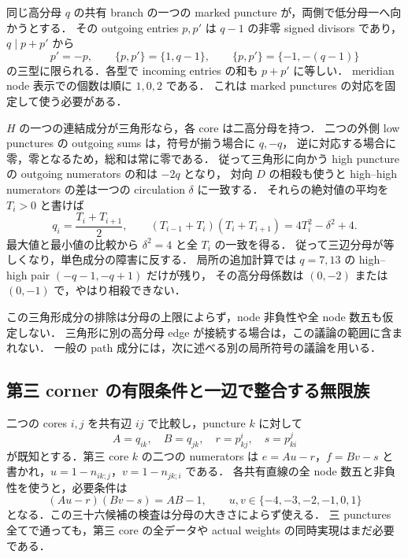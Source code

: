 同じ高分母 $q$ の共有 branch の一つの marked puncture が，両側で低分母一へ向かうとする．
その outgoing entries $p,p'$ は $q-1$ の非零 signed divisors であり，
$q\mid p+p'$ から
\[
 p'=-p,\qquad\{p,p'\}=\{1,q-1\},\qquad
 \{p,p'\}=\{-1,-(q-1)\}
\]
の三型に限られる．各型で incoming entries の和も $p+p'$ に等しい．
meridian node 表示での個数は順に $1,0,2$ である．
これは marked punctures の対応を固定して使う必要がある．

$H$ の一つの連結成分が三角形なら，各 core は二高分母を持つ．
二つの外側 low punctures の outgoing sums は，符号が揃う場合に $q,-q$，
逆に対応する場合に零，零となるため，総和は常に零である．
従って三角形に向かう high puncture の outgoing numerators の和は $-2q$ となり，
対向 $D$ の相殺も使うと high--high numerators の差は一つの circulation $\delta$ に一致する．
それらの絶対値の平均を $T_i>0$ と書けば
\[
 q_i=\frac{T_i+T_{i+1}}2,\qquad
 (T_{i-1}+T_i)(T_i+T_{i+1})=4T_i^2-\delta^2+4.
\]
最大値と最小値の比較から $\delta^2=4$ と全 $T_i$ の一致を得る．
従って三辺分母が等しくなり，単色成分の障害に反する．
局所の追加計算では $q=7,13$ の high--high pair $(-q-1,-q+1)$ だけが残り，
その高分母係数は $(0,-2)$ または $(0,-1)$ で，やはり相殺できない．

この三角形成分の排除は分母の上限によらず，node 非負性や全 node 数五も仮定しない．
三角形に別の高分母 edge が接続する場合は，この議論の範囲に含まれない．
一般の path 成分には，次に述べる別の局所符号の議論を用いる．



\subsection{第三 corner の有限条件と一辺で整合する無限族}

二つの cores $i,j$ を共有辺 $ij$ で比較し，puncture $k$ に対して
\[
 A=q_{ik},\quad B=q_{jk},\quad r=p^i_{kj},\quad s=p^j_{ki}
\]
が既知とする．第三 core $k$ の二つの numerators は
$e=Au-r$，$f=Bv-s$ と書かれ，$u=1-n_{ik;j}$，$v=1-n_{jk;i}$ である．
各共有直線の全 node 数五と非負性を使うと，必要条件は
\[
 (Au-r)(Bv-s)=AB-1,
 \qquad u,v\in\{-4,-3,-2,-1,0,1\}
\]
となる．この三十六候補の検査は分母の大きさによらず使える．
三 punctures 全てで通っても，第三 core の全データや actual weights の同時実現はまだ必要である．

